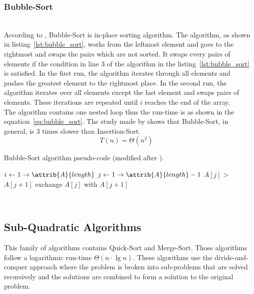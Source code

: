 \documentclass[sigconf, nonacm, natbib, screen, balance=False]{acmart}
\begin{document}
\subsubsection{Bubble-Sort}\label{sec:bubble_sort}
\hfill\\
According to \citet{CLRS_2009}, Bubble-Sort is in-place sorting algorithm. The algorithm, as shown in listing~\ref{lst:bubble_sort}, works from the leftmost element and goes to the rightmost and swaps the pairs which are not sorted. It swaps every pairs of elements if the condition in line $3$ of the algorithm in the listing~\ref{lst:bubble_sort} is satisfied. In the first run, the algorithm iterates through all elements and pushes the greatest element to the rightmost place. In the second run, the algorithm iterates over all elements except the last element and swaps pairs of elements. These iterations are repeated until $i$ reaches the end of the array.
\hfill\\
The algorithm contains one nested loop thus the run-time is as shown in the equation~\ref{eq:bubble_sort}. The study made by \citet{astrachan} shows that Bubble-Sort, in general, is $3$ times slower than Insertion-Sort.
\begin{equation}
  T(n) = \Theta(n^2) \;   \label{eq:bubble_sort}
\end{equation}
\begin{listing}
  \caption{Bubble-Sort algorithm pseudo-code (modified after \citet[Ch.~2.3]{CLRS_2009}).}
  \label{lst:bubble_sort}
  \begin{codebox}
    \li \For $i \gets 1 \to \attrib{A}{length}$
    \Do
    \li \For $j \gets 1 \to \attrib{A}{length}-1$
    \Do
    \li \If $A[j]$ > $A[j+1]$
    \li \Then exchange $A[j]$ with $A[j+1]$
    \End
    \End
  \end{codebox}
\end{listing}
\hfill\\
\subsection{Sub-Quadratic Algorithms}
This family of algorithms contains Quick-Sort and Merge-Sort. Those algorithms follow a logarithmic run-time $\Theta(n \cdot \lg n)$. These algorithms use the divide-and-conquer approach where the problem is broken into sub-problems that are solved recursively and the solutions are combined to form a solution to the original problem.
\end{document}
